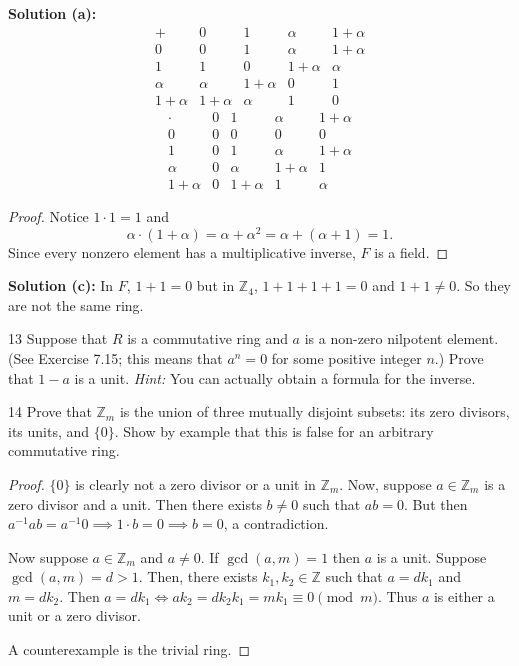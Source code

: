 \textbf{Solution (a):}
\[
\begin{array}{c|cccc}
+ & 0 & 1 & \alpha & 1+\alpha \\
\hline
0 & 0 & 1 & \alpha & 1+\alpha \\
1 & 1 & 0 & 1+\alpha & \alpha \\
\alpha & \alpha & 1+\alpha & 0 & 1 \\
1+\alpha & 1+\alpha & \alpha & 1 & 0
\end{array}
\]
\[
\begin{array}{c|cccc}
\cdot & 0 & 1 & \alpha & 1+\alpha \\
\hline
0 & 0 & 0 & 0 & 0 \\
1 & 0 & 1 & \alpha & 1+\alpha \\
\alpha & 0 & \alpha & 1+\alpha & 1 \\
1+\alpha & 0 & 1+\alpha & 1 & \alpha
\end{array}
\]

\begin{proof}
    Notice $1 \cdot 1 = 1$ and
    \[
    \alpha \cdot (1+\alpha) = \alpha + \alpha^2 = \alpha + (\alpha+1) = 1.
    \]
    Since every nonzero element has a multiplicative inverse, $F$ is a field.
\end{proof}

\textbf{Solution (c):}
In $F$, $1 + 1 = 0$ but in $\mathbb{Z}_4$, $1 + 1 + 1 + 1 = 0$ and $1 + 1 \ne 0$. So they are not the same ring.

\begin{problem}{13}
    Suppose that $R$ is a commutative ring and $a$ is a non-zero nilpotent element. (See
    Exercise 7.15; this means that $a^n = 0$ for some positive integer $n$.) Prove that
    $1 - a$ is a unit. \emph{Hint:} You can actually obtain a formula for the inverse.
\end{problem}
\unsolved

\begin{problem}{14}
    Prove that $\mathbb{Z}_m$ is the union of three mutually disjoint subsets: its 
    zero divisors, its units, and $\{0\}$. Show by example that this is false 
    for an arbitrary commutative ring.
\end{problem}
\solved

\begin{proof}
    $\{0\}$ is clearly not a zero divisor or a unit in $\mathbb{Z}_m$.
    Now, suppose $a \in \mathbb{Z}_m$ is a zero divisor and a unit.
    Then there exists $b \ne 0$ such that $ab = 0$.
    But then $a^{-1} ab = a^{-1} 0 \implies 1 \cdot b = 0 \implies b = 0$,
        a contradiction.

    Now suppose $a \in \mathbb{Z}_m$ and $a \ne 0$.
    If $\gcd(a, m) = 1$ then $a$ is a unit.
    Suppose $\gcd(a, m) = d > 1$.
    Then, there exists $k_1, k_2 \in \mathbb{Z}$ such that $a = d k_1$ and $m = d k_2$.
    Then $a = d k_1 \iff a k_2 = d k_2 k_1 = m k_1 \equiv 0 \pmod m$.
    Thus $a$ is either a unit or a zero divisor.

    A counterexample is the trivial ring.
\end{proof}


